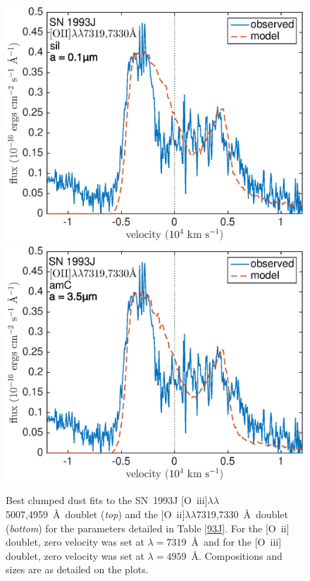 \begin{figure}
\includegraphics[scale=0.4,clip=true, trim=0 0 40 20]{chapters/chapter6/figs/93J/clumped/OII_sil}
\includegraphics[scale=0.4,clip=true, trim=30 0 40 20]{chapters/chapter6/figs/93J/clumped/OII_amC}
\caption{Best clumped dust fits to the SN~1993J [O~{\sc iii}]$\lambda\lambda$5007,4959~\AA\ doublet ({\em top}) and the [O~{\sc ii}]$\lambda\lambda$7319,7330~\AA\ doublet  ({\em bottom}) for the parameters detailed in Table \ref{93J}.  For the [O~{\sc ii}] doublet, zero velocity was set at $\lambda=7319$~\AA\ and for the [O~{\sc iii}] doublet, zero velocity was set at $\lambda=4959$~\AA. Compositions and sizes are as detailed on the plots.}
\label{93J_clumped}
\end{figure}

